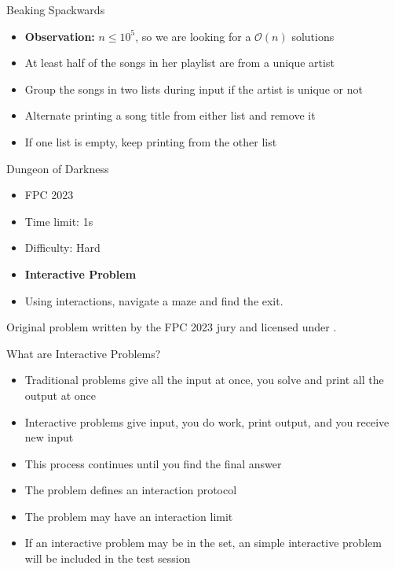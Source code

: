 \documentclass[11pt,pdf, aspectratio=169]{beamer}
\begin{document}
  \begin{frame}{Beaking Spackwards}
    \begin{itemize}
      \item<1-> \textbf{Observation:} $n \leq 10^5$, so we are looking for a $\mathcal{O}(n)$ solutions
      \item<1-> At least half of the songs in her playlist are from a unique artist
      \item<2-> Group the songs in two lists during input if the artist is unique or not
      \item<3-> Alternate printing a song title from either list and remove it
      \item<3-> If one list is empty, keep printing from the other list
    \end{itemize}
  \end{frame}
  \begin{frame}{Dungeon of Darkness}
    \begin{itemize}
      \item FPC 2023
      \item Time limit: 1s
      \item Difficulty: Hard
      \item \textbf{Interactive Problem}
      \item Using interactions, navigate a maze and find the exit.
    \end{itemize}
    Original problem written by the FPC 2023 jury and licensed under \doclicenseLongNameRef.

    \doclicenseImage

  \end{frame}
  \begin{frame}{What are Interactive Problems?}
    \begin{itemize}
      \item Traditional problems give all the input at once, you solve and print all the output at once
      \item Interactive problems give input, you do work, print output, and you receive new input
      \item This process continues until you find the final answer
      \item The problem defines an interaction protocol
      \item The problem may have an interaction limit
      \item If an interactive problem may be in the set, an simple interactive problem will be included in the test session
    \end{itemize}
  \end{frame}
\end{document}
